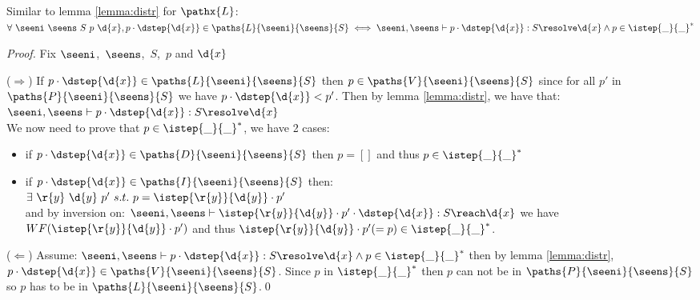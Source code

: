  \begin{lemma}\label{lemma:pathl} Similar to lemma \ref{lemma:distr} for $\pathx{L}$:\\
$\forall\ \seeni\ \seens\ S\ p\ \d{x},
 p \cdot \dstep{\d{x}}\in\paths{L}{\seeni}{\seens}{S} \iff \seeni,\seens \vdash p \cdot \dstep{\d{x}}: S \resolve \d{x} \wedge p \in \istep{\_}{\_}^*$
 \end{lemma}
 \begin{proof} Fix $\seeni$,\ $\seens$,\ $S$,\ $p$ and $\d{x}$

\noindent ($\Rightarrow$) If $p \cdot \dstep{\d{x}} \in \paths{L}{\seeni}{\seens}{S}$ then $p \in \paths{V}{\seeni}{\seens}{S}$ since for all $p'$ in $\paths{P}{\seeni}{\seens}{S}$ we have $p \cdot \dstep{\d{x}} < p'$.
Then by lemma \ref{lemma:distr}, we have that:\\
\tab $\seeni,\seens \vdash p \cdot \dstep{\d{x}}: S \resolve \d{x}$\\
We now need to prove that $p \in \istep{\_}{\_}^*$, we have 2 cases:
\begin{itemize}
 \item if $p \cdot\dstep{\d{x}}\in \paths{D}{\seeni}{\seens}{S}$ then $p=[]$ and thus $p\in \istep{\_}{\_}^*$
 \item if $p \cdot\dstep{\d{x}}\in \paths{I}{\seeni}{\seens}{S}$ then:\\
\tab $\exists\ \r{y}\ \d{y}\ p'\ s.t.\ p = \istep{\r{y}}{\d{y}}\cdot p'$\\
and by inversion on:
\tab $\seeni,\seens \vdash \istep{\r{y}}{\d{y}} \cdot p' \cdot\dstep{\d{x}}  : S \reach \d{x}$
we have $WF(\istep{\r{y}}{\d{y}} \cdot p')$ and thus $\istep{\r{y}}{\d{y}} \cdot p' (= p) \in  \istep{\_}{\_}^*$.
\end{itemize}\medskip

\noindent ($\Leftarrow$) Assume:
\tab $\seeni,\seens \vdash p \cdot \dstep{\d{x}}: S \resolve \d{x} \wedge p \in \istep{\_}{\_}^*$
then by lemma \ref{lemma:distr}, $p \cdot \dstep{\d{x}} \in \paths{V}{\seeni}{\seens}{S}$. 
Since $p$ in $\istep{\_}{\_}^*$ then $p$ can not be in $\paths{P}{\seeni}{\seens}{S}$ so $p$ has to be in $\paths{L}{\seeni}{\seens}{S}$.\qed
 \end{proof}





